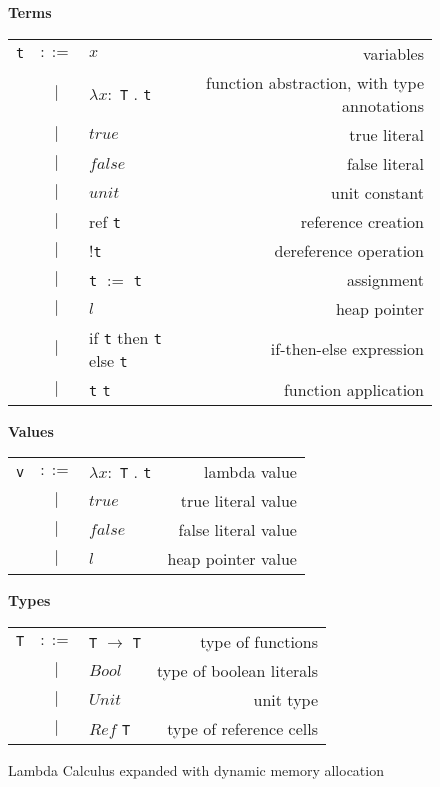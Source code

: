 \begin{figure}[H]\label{fig:simpleCalc}
    \vspace{1cm}
    \textbf{Terms} \\
    \begin{tabular}{l c p{3cm} r}
        \texttt{t} & $ ::= $ & $ x $ &                   variables \\
      & $ | $ & $ \lambda x : $ \texttt{T} . \texttt{t} &          function abstraction, with type annotations \\
      & $ | $ & $ true $ &          true literal \\
      & $ | $ & $ false $ &          false literal \\
      & $ | $ & $ unit $ &          unit constant \\
      & $ | $ & ref \texttt{t} &    reference creation \\
      & $ | $ & !\texttt{t} &    dereference operation \\
      & $ | $ & \texttt{t} $ := $ \texttt{t} &    assignment \\
      & $ | $ & $ l $ &    heap pointer \\
      & $ | $ & if \texttt{t} then \texttt{t} else \texttt{t}  &          if-then-else expression \\
      & $ | $ & \texttt{t} \texttt{t} &          function application \\
    \end{tabular}

    \vspace{1cm}
    \textbf{Values} \\
    \begin{tabular}{l c p{3cm} r}
        \texttt{v} & $ ::= $ & $ \lambda x : $ \texttt{T} . \texttt{t} &                   lambda value \\
      & $ | $ & $ true $ &          true literal value \\
      & $ | $ & $ false $ &          false literal value \\
      & $ | $ & $ l $ &          heap pointer value \\
    \end{tabular}

    \vspace{1cm}
    \textbf{Types} \\
    \begin{tabular}{l c p{3cm} r}
        \texttt{T} & $ ::= $ & \texttt{T} $ \rightarrow $ \texttt{T} &      type of functions \\
      & $ | $ & $ Bool $ &          type of boolean literals \\
      & $ | $ & $ Unit $ &          unit type \\
      & $ | $ & $ Ref $ \texttt{T} &          type of reference cells \\
    \end{tabular}

    \caption{Lambda Calculus expanded with dynamic memory allocation}
\end{figure}

